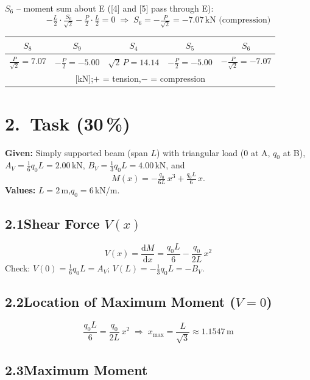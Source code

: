\documentclass[a4paper,11pt]{article}
\begin{document}
\textbf{$S_6$} -- moment sum about E ([4] and [5] pass through E):
\[
  -\tfrac{L}{2}\cdot\tfrac{S_6}{\sqrt{2}} - \tfrac{P}{2}\cdot\tfrac{L}{2} = 0
  \;\Rightarrow\; \boxed{S_6 = -\tfrac{P}{\sqrt{2}} = -7.07\,\text{kN (compression)}}
\]

\medskip
\begin{center}
\begin{tabular}{ccccc}
\toprule
$S_8$ & $S_9$ & $S_4$ & $S_5$ & $S_6$ \\
\midrule
$\tfrac{P}{\sqrt{2}} = 7.07$ & $-\tfrac{P}{2} = -5.00$ &
$\sqrt{2}\,P = 14.14$ & $-\tfrac{P}{2} = -5.00$ & $-\tfrac{P}{\sqrt{2}} = -7.07$ \\
\multicolumn{5}{c}{\small [kN];\quad $+$ = tension,\quad $-$ = compression} \\
\bottomrule
\end{tabular}
\end{center}

\newpage
\section*{2.~Task \hfill (30\,\%)}

\textbf{Given:} Simply supported beam (span $L$) with triangular load
(0 at A, $q_0$ at B),
$A_V = \tfrac{1}{6}q_0 L = 2.00$\,kN,
$B_V = \tfrac{1}{3}q_0 L = 4.00$\,kN, and
\[
  M(x) = -\tfrac{q_0}{6L}\,x^3 + \tfrac{q_0 L}{6}\,x.
\]
\textbf{Values:} $L = 2$\,m,\quad $q_0 = 6$\,kN/m.

\subsection*{2.1\quad Shear Force $V(x)$}

\[
  V(x) = \frac{\mathrm{d}M}{\mathrm{d}x}
        = \frac{q_0 L}{6} - \frac{q_0}{2L}\,x^2
\]
Check: $V(0) = \tfrac{1}{6}q_0 L = A_V$\;\checkmark;\quad
$V(L) = -\tfrac{1}{3}q_0 L = -B_V$\;\checkmark.

\subsection*{2.2\quad Location of Maximum Moment ($V = 0$)}

\[
  \frac{q_0 L}{6} = \frac{q_0}{2L}\,x^2
  \;\Rightarrow\; \boxed{x_{\max} = \frac{L}{\sqrt{3}} \approx 1.1547\,\text{m}}
\]

\subsection*{2.3\quad Maximum Moment}
\end{document}
